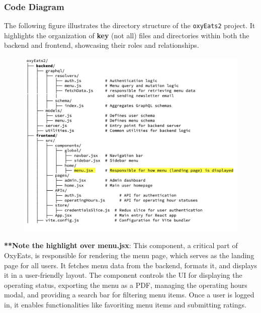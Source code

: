 \documentclass[10pt,twocolumn]{article}
\begin{document}
\subsubsection{Code Diagram}
The following figure illustrates the directory structure of the \texttt{oxyEats2} project. It highlights the organization of \textbf{key} (not all) files and directories within both the backend and frontend, showcasing their roles and relationships. 
\begin{figure}[H]
    \centering
    \includegraphics[width=.95\linewidth]{images/Screenshot 2024-12-05 at 4.49.59 PM.png} %
\end{figure}
\textbf{**Note the highlight over menu.jsx}: This component, a critical part of OxyEats, is responsible for rendering the menu page, which serves as the landing page for all users. It fetches menu data from the backend, formats it, and displays it in a user-friendly layout. The component controls the UI for displaying the operating status, exporting the menu as a PDF, managing the operating hours modal, and providing a search bar for filtering menu items. Once a user is logged in, it enables functionalities like favoriting menu items and submitting ratings.
\end{document}
